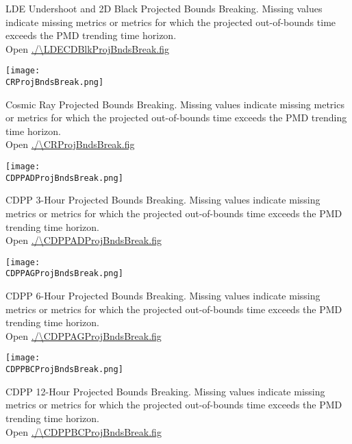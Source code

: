 LDE Undershoot and 2D Black Projected Bounds Breaking. Missing values
indicate missing metrics or metrics for which the projected
out-of-bounds time exceeds the PMD trending time horizon.\\
Open \url{./\LDECDBlkProjBndsBreak.fig}

\clearpage
\begin{center}
\texttt{[image: \\CRProjBndsBreak.png]}
\end{center}

Cosmic Ray Projected Bounds Breaking. Missing values indicate missing
metrics or metrics for which the projected out-of-bounds time exceeds
the PMD trending time horizon.\\
Open \url{./\CRProjBndsBreak.fig}

\begin{center}
\texttt{[image: \\CDPPADProjBndsBreak.png]}
\end{center}

CDPP 3-Hour Projected Bounds Breaking. Missing values indicate missing
metrics or metrics for which the projected out-of-bounds time exceeds
the PMD trending time horizon.\\
Open \url{./\CDPPADProjBndsBreak.fig}

\clearpage
\begin{center}
\texttt{[image: \\CDPPAGProjBndsBreak.png]}
\end{center}

CDPP 6-Hour Projected Bounds Breaking. Missing values indicate missing
metrics or metrics for which the projected out-of-bounds time exceeds
the PMD trending time horizon.\\
Open \url{./\CDPPAGProjBndsBreak.fig}

\begin{center}
\texttt{[image: \\CDPPBCProjBndsBreak.png]}
\end{center}

CDPP 12-Hour Projected Bounds Breaking. Missing values indicate
missing metrics or metrics for which the projected out-of-bounds time
exceeds the PMD trending time horizon.\\
Open \url{./\CDPPBCProjBndsBreak.fig}
